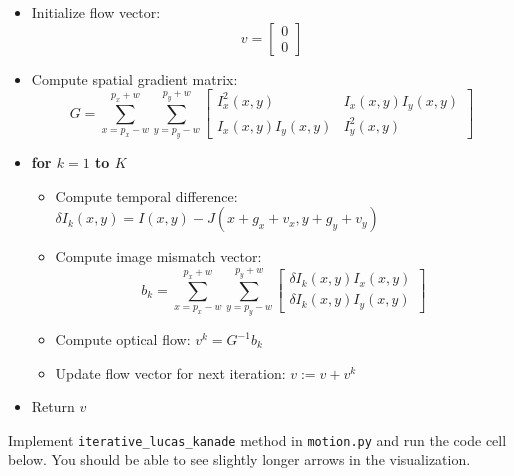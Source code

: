 \documentclass[11pt]{article}
\providecommand{\tightlist}{%
      \setlength{\itemsep}{0pt}\setlength{\parskip}{0pt}}
\begin{document}
\begin{itemize}
\item
  Initialize flow vector: \[
  v=
  \begin{bmatrix}
    0\\0
  \end{bmatrix}
  \]
\item
  Compute spatial gradient matrix: \[
  G=\sum_{x=p_x-w}^{p_x+w}\sum_{y=p_y-w}^{p_y+w}
  \begin{bmatrix}
    I_{x}^2(x,y) & I_{x}(x,y)I_{y}(x,y)\\
    I_{x}(x,y)I_{y}(x,y) & I_{y}^2(x,y)
  \end{bmatrix}
  \]
\item
  \textbf{for \(k=1\) to \(K\)}

  \begin{itemize}
  \tightlist
  \item
    Compute temporal difference:
    \(\delta I_k(x, y) = I(x,y)-J(x+g_x+v_x, y+g_y+v_y)\)
  \item
    Compute image mismatch vector: \[
    b_k=\sum_{x=p_x-w}^{p_x+w}\sum_{y=p_y-w}^{p_y+w}
    \begin{bmatrix}
      \delta I_k(x, y)I_x(x,y)\\
      \delta I_k(x, y)I_y(x,y)
    \end{bmatrix}
    \]
  \item
    Compute optical flow: \(v^k=G^{-1}b_k\)
  \item
    Update flow vector for next iteration: \(v := v + v^k\)
  \end{itemize}
\item
  Return \(v\)
\end{itemize}

Implement \texttt{iterative\_lucas\_kanade} method in \texttt{motion.py}
and run the code cell below. You should be able to see slightly longer
arrows in the visualization.
\end{document}
